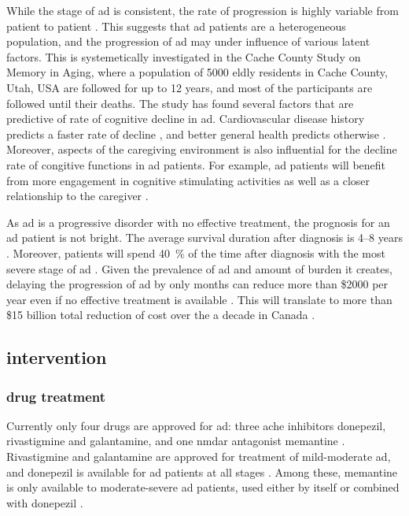 While the stage of \gls{ad} is consistent, the rate of progression is highly variable from patient to patient \citep{komarova11, tschanz11}. This suggests that \gls{ad} patients are a heterogeneous population, and the progression of \gls{ad} may under influence of various latent factors. This is systemetically investigated in the Cache County Study on Memory in Aging, where a population of \num{5000} eldly residents in Cache County, Utah, USA are followed for up to \num{12} years, and most of the participants are followed until their deaths. The study has found several factors that are predictive of rate of cognitive decline in \gls{ad}. Cardiovascular disease history predicts a faster rate of decline \citep{mielke07}, and better general health predicts otherwise \citep{leoutsakos12}. Moreover, aspects of the caregiving environment is also influential for the decline rate of congitive functions in \gls{ad} patients. For example, \gls{ad} patients will benefit from more engagement in cognitive stimulating activities \citep{treiber11} as well as a closer relationship to the caregiver \citep{norton09}.

As \gls{ad} is a progressive disorder with no effective treatment, the prognosis for an \gls{ad} patient is not bright. The average survival duration after diagnosis is 4--8 years \citep{larson04, helzner08}. Moreover, patients will spend \SI{40}{\percent} of the time after diagnosis with the most severe stage of \gls{ad} \citep{arrighi10}. Given the prevalence of \gls{ad} and amount of burden it creates, delaying the progression of \gls{ad} by only months can reduce more than \$\num{2000} per year even if no effective treatment is available \citep{zhu06}. This will translate to more than \$15 billion total reduction of cost over the a decade in Canada \citep{adc10}.

\subsection{intervention}
\subsubsection{drug treatment \label{treatment}}
Currently only four drugs are approved for \gls{ad}: three \gls{ache} inhibitors donepezil, rivastigmine and galantamine, and one \gls{nmdar} antagonist memantine \citep{nelson15}. Rivastigmine and galantamine are approved for treatment of mild-moderate \gls{ad}, and donepezil is available for \gls{ad} patients at all stages \citep{bassil09, smith09}. Among these, memantine is only available to moderate-severe \gls{ad} patients, used either by itself or combined with donepezil \citep{nelson15}.

